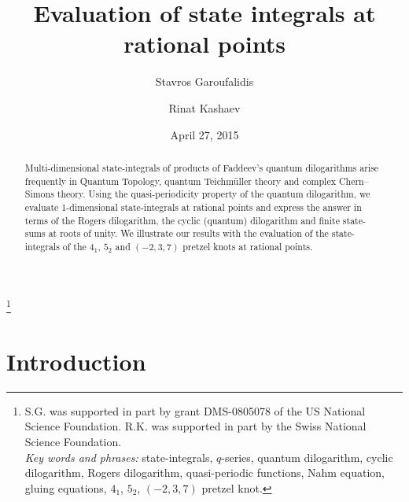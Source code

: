 \documentclass[12pt]{amsart}
\theoremstyle{definition}
\begin{document}
\title[Evaluation of state integrals at rational points]{Evaluation of state 
integrals at rational points}
\author{Stavros Garoufalidis}
\address{School of Mathematics \\
         Georgia Institute of Technology \\
         Atlanta, GA 30332-0160, USA \newline
         {\tt \url{http://www.math.gatech.edu/~stavros}}}
\author{Rinat Kashaev}
\address{Section de Math\'ematiques, Universit\'e de Gen\`eve \\
2-4 rue du Li\`evre, Case Postale 64, 1211 Gen\`eve 4, Switzerland \newline
         {\tt \url{http://www.unige.ch/math/folks/kashaev}}}
\thanks{
S.G. was supported in part by grant DMS-0805078 of the US National Science 
Foundation. R.K. was supported in part by the Swiss National Science Foundation.
\\
{\em Key words and phrases:}
state-integrals, $q$-series, quantum dilogarithm, cyclic dilogarithm, 
Rogers dilogarithm, quasi-periodic functions,
Nahm equation, gluing equations, $4_1$, $5_2$, $(-2,3,7)$ pretzel knot.
}

\date{April 27, 2015}%

\begin{abstract}
Multi-dimensional state-integrals of products of Faddeev's quantum 
dilogarithms arise frequently in Quantum Topology, quantum Teichm\"uller theory
and complex Chern--Simons theory. Using the quasi-periodicity property 
of the quantum dilogarithm, we evaluate 1-dimensional state-integrals at 
rational points and express the answer in terms of the Rogers dilogarithm,
the cyclic (quantum) dilogarithm and finite state-sums at roots of unity. 
We illustrate our results with the evaluation of the state-integrals 
of the $4_1$, $5_2$ and $(-2,3,7)$ pretzel knots at rational points.
\end{abstract}

\maketitle

\tableofcontents


\section{Introduction}
\label{sec.intro}
\end{document}
